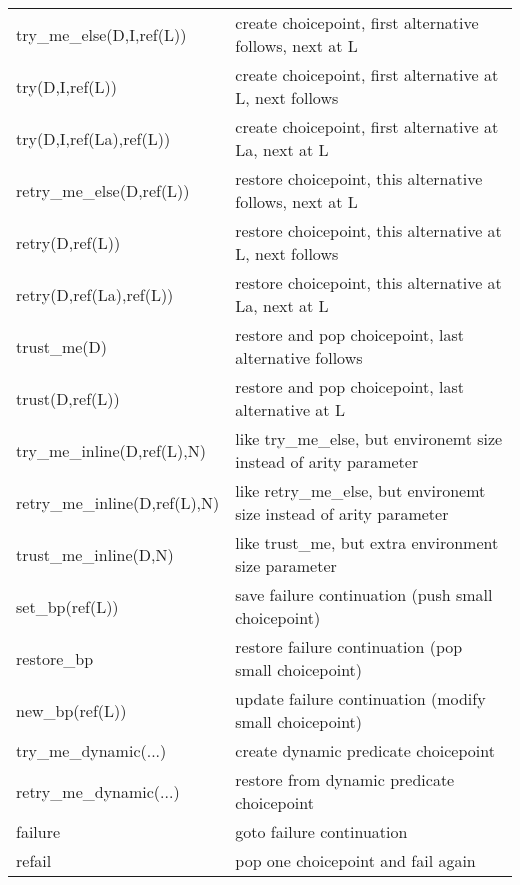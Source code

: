 \begin{tabular}{|l|l|}
\hline
try_me_else(D,I,ref(L))         & create choicepoint, first alternative follows, next at L                \\
try(D,I,ref(L))                 & create choicepoint, first alternative at L, next follows        \\
try(D,I,ref(La),ref(L))         & create choicepoint, first alternative at La, next at L                  \\
retry_me_else(D,ref(L))         & restore choicepoint, this alternative follows, next at L                \\
retry(D,ref(L))                 & restore choicepoint, this alternative at L, next follows        \\
retry(D,ref(La),ref(L))         & restore choicepoint, this alternative at La, next at L                  \\
trust_me(D)                     & restore and pop choicepoint, last alternative follows   \\
trust(D,ref(L))                 & restore and pop choicepoint, last alternative at L      \\
\hline
try_me_inline(D,ref(L),N)       & like try_me_else, but environemt size instead of arity parameter                        \\
retry_me_inline(D,ref(L),N)     & like retry_me_else, but environemt size instead of arity parameter                      \\
trust_me_inline(D,N)            & like trust_me, but extra environment size parameter             \\
\hline
set_bp(ref(L))                  & save failure continuation (push small choicepoint)      \\
restore_bp                      & restore failure continuation (pop small choicepoint)    \\
new_bp(ref(L))                  & update failure continuation (modify small choicepoint)          \\
\hline
try_me_dynamic(...)             & create dynamic predicate choicepoint            \\
retry_me_dynamic(...)           & restore from dynamic predicate choicepoint              \\
\hline
failure                         & goto failure continuation \\
refail                          & pop one choicepoint and fail again \\
\hline
\end{tabular}

